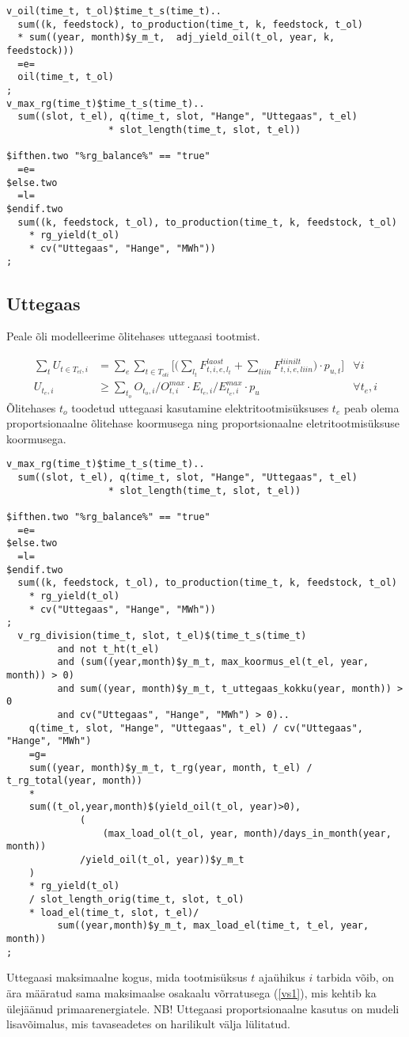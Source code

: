 \documentclass[10pt,a4paper]{article}
\begin{document}
\begin{verbatim}
v_oil(time_t, t_ol)$time_t_s(time_t)..
  sum((k, feedstock), to_production(time_t, k, feedstock, t_ol)
  * sum((year, month)$y_m_t,  adj_yield_oil(t_ol, year, k, feedstock)))
  =e=
  oil(time_t, t_ol)
;
v_max_rg(time_t)$time_t_s(time_t)..
  sum((slot, t_el), q(time_t, slot, "Hange", "Uttegaas", t_el)
                  * slot_length(time_t, slot, t_el))

$ifthen.two "%rg_balance%" == "true"
  =e=
$else.two
  =l=
$endif.two
  sum((k, feedstock, t_ol), to_production(time_t, k, feedstock, t_ol)
    * rg_yield(t_ol)
    * cv("Uttegaas", "Hange", "MWh"))
;
\end{verbatim}

\subsection{Uttegaas}
Peale õli modelleerime õlitehases uttegaasi tootmist.

\begin{align}
\sum_t U_{t\in T_{el},i} &= \sum_e \sum_{t\in T_{oli}} \bigg[ \bigg(\sum_{l_t} F^{laost}_{t,i,e,l_t} + \sum_{liin} F^{liinilt}_{t,i,e,liin}\bigg)\cdot  p_{u,t}\bigg] &\forall i \\
U_{t_e,i} &\geq \sum_{t_o} O_{t_o,i}/O^{max}_{t,i} \cdot E_{t_e,i} / E^{max}_{t_e,i}\cdot p_{u} &\forall t_e,i
\end{align}
Õlitehases $t_o$ toodetud uttegaasi kasutamine elektritootmisüksuses $t_e$ peab olema  proportsionaalne õlitehase koormusega ning proportsionaalne eletritootmisüksuse koormusega.

\begin{verbatim}
v_max_rg(time_t)$time_t_s(time_t)..
  sum((slot, t_el), q(time_t, slot, "Hange", "Uttegaas", t_el)
                  * slot_length(time_t, slot, t_el))

$ifthen.two "%rg_balance%" == "true"
  =e=
$else.two
  =l=
$endif.two
  sum((k, feedstock, t_ol), to_production(time_t, k, feedstock, t_ol)
    * rg_yield(t_ol)
    * cv("Uttegaas", "Hange", "MWh"))
;
  v_rg_division(time_t, slot, t_el)$(time_t_s(time_t)
         and not t_ht(t_el)
         and (sum((year,month)$y_m_t, max_koormus_el(t_el, year, month)) > 0)
         and sum((year, month)$y_m_t, t_uttegaas_kokku(year, month)) > 0
         and cv("Uttegaas", "Hange", "MWh") > 0)..
    q(time_t, slot, "Hange", "Uttegaas", t_el) / cv("Uttegaas", "Hange", "MWh")
    =g=
    sum((year, month)$y_m_t, t_rg(year, month, t_el) / t_rg_total(year, month))
    *
    sum((t_ol,year,month)$(yield_oil(t_ol, year)>0),
             (
                 (max_load_ol(t_ol, year, month)/days_in_month(year, month))
             /yield_oil(t_ol, year))$y_m_t
    )
    * rg_yield(t_ol)
    / slot_length_orig(time_t, slot, t_ol)
    * load_el(time_t, slot, t_el)/
         sum((year,month)$y_m_t, max_load_el(time_t, t_el, year, month))
;
\end{verbatim}
Uttegaasi maksimaalne kogus, mida tootmisüksus $t$ ajaühikus $i$ tarbida võib, on ära määratud sama maksimaalse osakaalu võrratusega (\ref{vs1}), mis kehtib ka ülejäänud primaarenergiatele. NB! Uttegaasi proportsionaalne kasutus on mudeli lisavõimalus, mis tavaseadetes on harilikult välja lülitatud.
\end{document}
